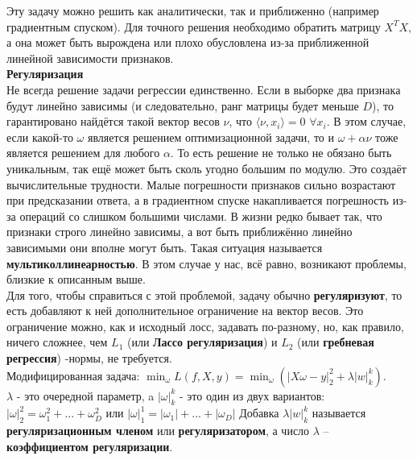 Эту задачу можно решить как аналитически, так и приближенно (например градиентным спуском).
Для точного решения необходимо обратить матрицу $X^TX$, а она может быть вырождена или плохо обусловлена из-за приближенной линейной зависимости признаков. \\

\textbf{Регуляризация} \\
Не всегда решение задачи регрессии единственно. Если в выборке два признака будут линейно зависимы (и следовательно, ранг матрицы будет меньше $D$), то гарантировано найдётся такой вектор весов $\nu$, что $\langle\nu,x_i\rangle=0  
 $ $\forall x_i$. В этом случае, если какой-то $\omega$ является решением оптимизационной задачи, то и $\omega+\alpha\nu$ тоже является решением для любого $\alpha$. То есть решение не только не обязано быть уникальным, так ещё может быть сколь угодно большим по модулю. Это создаёт вычислительные трудности. Малые погрешности признаков сильно возрастают при предсказании ответа, а в градиентном спуске накапливается погрешность из-за операций со слишком большими числами. В жизни редко бывает так, что признаки строго линейно зависимы, а вот быть приближённо линейно зависимыми они вполне могут быть. Такая ситуация называется \textbf{мультиколлинеарностью}. В этом случае у нас, всё равно, возникают проблемы, близкие к описанным выше. \\


Для того, чтобы справиться с этой проблемой, задачу обычно \textbf{регуляризуют}, то есть добавляют к ней дополнительное ограничение на вектор весов. Это ограничение можно, как и исходный лосс, задавать по-разному, но, как правило, ничего сложнее, чем $L_1$ (или \textbf{Лассо регуляризация}) и $L_2$ (или \textbf{гребневая регрессия}) -нормы, не требуется. \\
Модифицированная задача: $\min_{\omega}L(f, X, y) = \min_{\omega}(|X\omega-y|_2^2+\lambda|w|_k^k)$. \\
$\lambda$ - это очередной параметр, a $|\omega|_k^k$ - это один из двух вариантов:
$|\omega|_2^2=\omega_1^2+...+\omega_D^2$ или $ |\omega|_1^1=|\omega_1|+...+|\omega_D|$
Добавка $\lambda|w|_k^k$ называется \textbf{регуляризационным членом} или \textbf{регуляризатором}, а число $\lambda$ – \textbf{коэффициентом регуляризации}.

